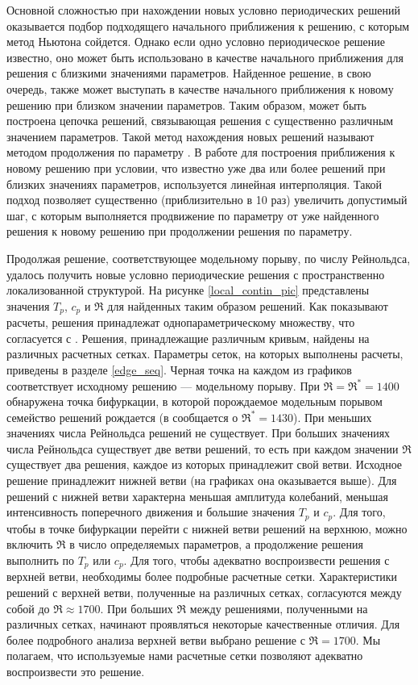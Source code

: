 Основной сложностью при нахождении новых условно периодических решений оказывается подбор подходящего начального приближения к решению, с которым метод Ньютона сойдется. Однако если одно условно периодическое решение известно, оно может быть использовано в качестве начального приближения для решения с близкими значениями параметров. Найденное решение, в свою очередь, также может выступать в качестве начального приближения к новому решению при близком значении параметров. Таким образом, может быть построена цепочка решений, связывающая решения с существенно различным значением параметров. Такой метод нахождения новых решений называют методом продолжения по параметру \cite{Viswanath2007, Dijkstra2014}. В работе для построения приближения к новому решению при условии, что известно уже два или более решений при близких значениях параметров, используется линейная интерполяция. Такой подход позволяет существенно (приблизительно в 10 раз) увеличить допустимый шаг, с которым выполняется продвижение по параметру от уже найденного решения к новому решению при продолжении решения по параметру. 

Продолжая решение, соответствующее модельному порыву, по числу Рейнольдса, удалось получить новые условно периодические решения с пространственно локализованной структурой. На рисунке \ref{local_contin_pic} представлены значения $T_p$, $c_p$ и $\Re$ для найденных таким образом решений. Как показывают расчеты, решения принадлежат однопараметрическому множеству, что согласуется с \cite{Avila2013}. Решения, принадлежащие различным кривым, найдены на различных расчетных сетках. Параметры сеток, на которых выполнены расчеты, приведены в разделе \ref{edge_seq}. Черная точка на каждом из графиков соответствует исходному решению --- модельному порыву. При $\Re = \Re^* = 1400$ обнаружена точка бифуркации, в которой порождаемое модельным порывом семейство решений рождается (в \cite{Avila2013} сообщается о $\Re^* = 1430$). При меньших значениях числа Рейнольдса решений не существует. При больших значениях числа Рейнольдса существует две ветви решений, то есть при каждом значении $\Re$ существует два решения, каждое из которых принадлежит свой ветви. Исходное решение принадлежит нижней ветви (на графиках она оказывается выше). Для решений с нижней ветви характерна меньшая амплитуда колебаний, меньшая интенсивность поперечного движения и большие значения $T_p$ и $c_p$. Для того, чтобы в точке бифуркации перейти с нижней ветви решений на верхнюю, можно включить $\Re$ в число определяемых параметров, а продолжение решения выполнить по $T_p$ или $c_p$. Для того, чтобы адекватно воспроизвести решения с верхней ветви, необходимы более подробные расчетные сетки. Характеристики решений с верхней ветви, полученные на различных сетках, согласуются между собой до $\Re \approx 1700$. При больших $\Re$ между решениями, полученными на различных сетках, начинают проявляться некоторые качественные отличия. Для более подробного анализа верхней ветви выбрано решение с $\Re = 1700$. Мы полагаем, что используемые нами расчетные сетки позволяют адекватно воспроизвести это решение. 


